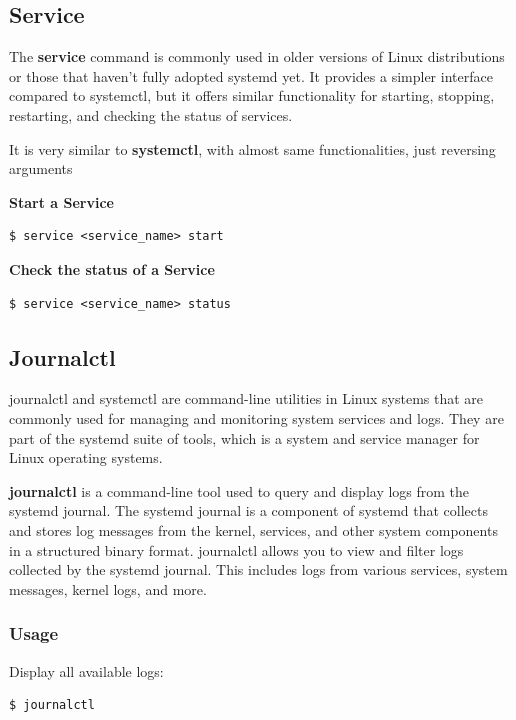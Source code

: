 \documentclass{article}
\newenvironment{codetemplate}[1][]{%
  \mybasecolorbox[#1]
  \itshape
}{%
  \endmybasecolorbox
}
\begin{document}
\subsection{Service}

The \textbf{service} command is commonly used in older versions of Linux distributions or those that haven't fully adopted systemd yet. It provides a simpler interface compared to systemctl, but it offers similar functionality for starting, stopping, restarting, and checking the status of services.

It is very similar to \textbf{systemctl}, with almost same functionalities, just reversing arguments

\textbf{Start a Service}
\begin{codetemplate}{}
\begin{verbatim}
$ service <service_name> start
\end{verbatim}
\end{codetemplate}

\textbf{Check the status of a Service}
\begin{codetemplate}{}
\begin{verbatim}
$ service <service_name> status
\end{verbatim}
\end{codetemplate}

\subsection{Journalctl}
journalctl and systemctl are command-line utilities in Linux systems that are commonly used for managing and monitoring system services and logs. They are part of the systemd suite of tools, which is a system and service manager for Linux operating systems.

\textbf{journalctl} is a command-line tool used to query and display logs from the systemd journal. The systemd journal is a component of systemd that collects and stores log messages from the kernel, services, and other system components in a structured binary format.
journalctl allows you to view and filter logs collected by the systemd journal. This includes logs from various services, system messages, kernel logs, and more.

\subsubsection{Usage}

Display all available logs:
\begin{codetemplate}{}
\begin{verbatim}
$ journalctl
\end{verbatim}
\end{codetemplate}
\end{document}
